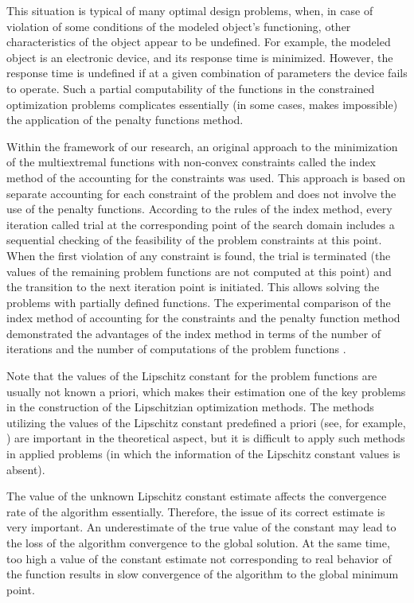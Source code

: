 \documentclass[review]{elsarticle}
\begin{document}
	This situation is typical of many optimal design problems, when, in case of violation of some conditions of the modeled object's functioning, other characteristics of the object appear to be undefined. For example, the modeled object is an electronic device, and its response time is minimized. However, the response time is undefined if at a given combination of parameters the device fails to operate. Such a partial computability of the functions in the constrained optimization problems complicates essentially (in some cases, makes impossible) the application of the penalty functions method. 
	
	Within the framework of our research, an original approach to the minimization of the multiextremal functions with non-convex constraints called the index method of the accounting for the constraints 
	\cite{Strongin} 
was used. This approach is based on separate accounting for each constraint of the problem and does not involve the use of the penalty functions. According to the rules of the index method, every iteration called trial at the corresponding point of the search domain includes a sequential checking of the feasibility of the problem constraints at this point. When the first violation of any constraint is found, the trial is terminated (the values of the remaining problem functions are not computed at this point) and the transition to the next iteration point is initiated. This allows solving the problems with partially defined functions. The experimental comparison of the index method of accounting for the constraints and the penalty function method demonstrated the advantages of the index method in terms of the number of iterations and the number of computations of the problem functions \cite{Barkalov2017_1, Barkalov2017_2}.
	
	Note that the values of the Lipschitz constant for the problem functions are usually not known a priori, which  makes their estimation one of the key problems in the construction of the Lipschitzian optimization methods. The methods utilizing the values of the Lipschitz constant predefined a priori (see, for example, \cite{Piyavskii1972, Shubert1972, Wood1991, Meewella1988, Mladineo1986}) are important in the theoretical aspect, but it is difficult to apply such methods in applied problems (in which the information of the Lipschitz constant values is absent).
		
		The value of the unknown Lipschitz constant estimate affects the convergence rate of the algorithm essentially. Therefore, the issue of its correct estimate is very important. An underestimate of the true value of the constant may lead to the loss of the algorithm convergence to the global solution. At the same time, too high a value of the constant estimate not corresponding to real behavior of the function results in slow convergence of the algorithm to the global minimum point. 
		
\end{document}

